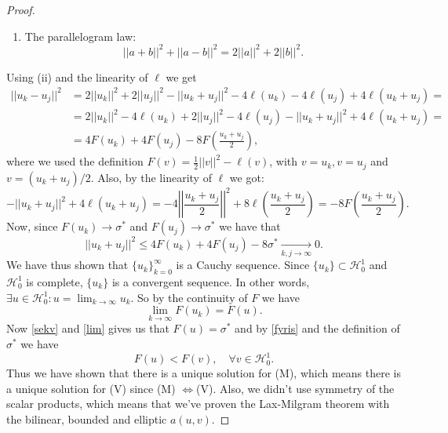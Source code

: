 \documentclass[12pt, a4paper]{article}
\numberwithin{equation}{section}
\begin{document}
\begin{proof}
\begin{enumerate}[label=(\roman*)]
\item The parallelogram law:
\begin{equation*}
||a+b||^2 + ||a-b||^2 = 2||a||^2+2||b||^2.
\end{equation*}
\end{enumerate}
Using (ii) and the linearity of $\ell$ we get
\begin{equation*}
\begin{split}
||u_k - u_j||^2 &= 2||u_k||^2 + 2||u_j||^2 - ||u_k + u_j||^2 - 4\ell(u_k) - 4\ell(u_j) + 4\ell(u_k+u_j) = \\
&= 2||u_k||^2 - 4\ell(u_k) + 2||u_j||^2 - 4\ell(u_j) - ||u_k + u_j||^2 +4\ell(u_k + u_j) = \\
&= 4F(u_k) + 4F(u_j) - 8F\left(\frac{u_k+u_j}{2}\right),
\end{split}
\end{equation*}
where we used the definition $F(v) = \frac{1}{2}||v||^2 - \ell(v)$, with $v = u_k, v = u_j$ and $v=(u_k+u_j)/2$. Also, by the linearity of $\ell$ we got:
\begin{equation*}
-||u_k+u_j||^2 +4\ell(u_k+u_j) = -4\left|\left| \frac{u_k+u_j}{2}\right|\right|^2 +8\ell\left(\frac{u_k+u_j}{2}\right) = -8F\left(\frac{u_k+u_j}{2}\right).
\end{equation*}
Now, since $F(u_k)\to \sigma^*$ and $F(u_j)\to \sigma^*$ we have that
\begin{equation*}
||u_k+u_j||^2 \leq 4F(u_k) + 4F(u_j) - 8\sigma^* \xrightarrow[k,j \to\infty]{ } 0.
\end{equation*}
We have thus shown that $\{u_k\}_{k=0}^\infty$ is a Cauchy sequence. Since $\{u_k\} \subset \mathcal{H}_0^1$ and $\mathcal{H}_0^1$ is complete, $\{u_k\}$ is a convergent sequence. In other words, $\exists u \in \mathcal{H}_0^1 : u = \lim_{k\to\infty} u_k$. So by the continuity of $F$ we have
\begin{equation}
\label{lim}
\lim_{k\to\infty} F(u_k) = F(u).
\end{equation}
Now \eqref{sekv} and \eqref{lim} gives us that $F(u)=\sigma^*$ and by \eqref{fyris} and the definition of $\sigma^*$ we have
\begin{equation*}
F(u) < F(v), \quad \forall v\in \mathcal{H}_0^1.
\end{equation*}
Thus we have shown that there is a unique solution for (M), which means there is a unique solution for (V) since (M) $\Leftrightarrow$(V). Also, we didn't use symmetry of the scalar products, which means that we've proven the Lax-Milgram theorem with the bilinear, bounded and elliptic $a(u,v)$.
\end{proof}
\end{document}
